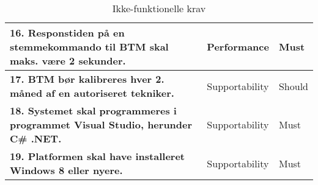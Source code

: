 \begin{table} [htbp]
\begin{tabular}{|p{10cm}|l|l|}
\textbf{16. Responstiden på en stemmekommando til BTM skal maks. være 2 sekunder.} & Performance & Must \\ \hline
\textbf{17. BTM bør kalibreres hver 2. måned af en autoriseret tekniker. } & Supportability & Should \\ \hline
\textbf{18. Systemet skal programmeres i programmet Visual Studio, herunder C\# .NET.} & Supportability & Must \\ \hline
\textbf{19. Platformen skal have installeret Windows 8 eller nyere.} & Supportability & Must \\ \hline

\end{tabular}
\caption{Ikke-funktionelle krav}
\label{tb:ikkefunkkrav} 
\end{table}
